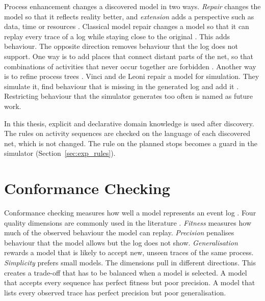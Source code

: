 Process enhancement changes a discovered model in two ways. \emph{Repair}
changes the model so that it reflects reality better, and \emph{extension} adds
a perspective such as data, time or resources \cite{Aalst2016,RWdeLeoni2022Enhancement}.
Classical model repair changes a model so that it can replay every trace of a
log while staying close to the original \cite{RWFahland2015Repair}.
This adds behaviour. The opposite direction removes behaviour that the log
does not support. One way is to add places that connect distant parts of the
net, so that combinations of activities that never occur together are forbidden
\cite{RWKalenkova2020NonLocal}. Another way is to refine process trees
\cite{RWRennert2024Precision}. Vinci and de Leoni repair a model for
simulation. They simulate it, find behaviour that is missing in the generated
log and add it \cite{SimulationGuidedRepair2025}. Restricting behaviour that
the simulator generates too often is named as future work.

In this thesis, explicit and declarative domain knowledge is used after
discovery. The rules on activity sequences are checked on the language of each
discovered net, which is not changed. The rule on the planned stops becomes a
guard in the simulator (Section~\ref{sec:exp_rules}).

\section{Conformance Checking}
\label{sec:bg_conformance}

Conformance checking measures how well a model represents an event log
\cite{aalst2012ConformanceChecking,RWCarmona2022Conformance}. Four quality
dimensions are commonly used in the literature \cite{Buijs2014Quality}.
\emph{Fitness} measures how much of the observed behaviour the model can replay.
\emph{Precision} penalises behaviour that the model allows but the log does not
show. \emph{Generalisation} rewards a model that is likely to accept new, unseen
traces of the same process. \emph{Simplicity} prefers small models. The
dimensions pull in different directions. This creates a trade-off that has to be
balanced when a model is selected. A model that accepts every sequence
has perfect fitness but poor precision. A model that lists every observed trace
has perfect precision but poor generalisation.

